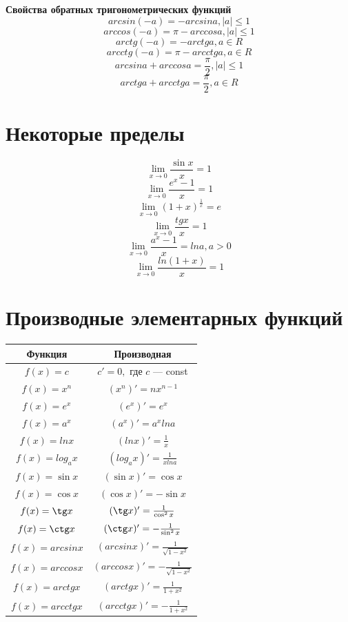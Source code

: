 \documentclass[a5paper, 8pt]{extarticle}
\begin{document}
\textbf{Свойства обратных тригонометрических функций}
$$arcsin(-a)=-arcsin a, |a|\le 1$$
$$arccos(-a)=\pi-arccos a, |a|\le 1$$
$$arctg(-a)=-arctg a, a\in R$$
$$arcctg(-a)=\pi-arcctg a, a\in R$$
$$arcsin a+ arccos a=\frac{\pi}{2}, |a|\le 1$$
$$arctg a+ arcctg a=\frac{\pi}{2}, a\in R$$

\section{Некоторые пределы}
$$\lim\limits_{x\to 0}\frac{\sin x}{x}=1$$
$$\lim\limits_{x\to 0}\frac{e^x-1}{x}=1$$
$$\lim\limits_{x\to 0}(1+x)^{\frac{1}{x}}=e$$
$$\lim\limits_{x\to 0}\frac{tg x}{x}=1$$
$$\lim\limits_{x\to 0}\frac{a^x-1}{x}=ln a, a>0$$
$$\lim\limits_{x\to 0}\frac{ln(1+x)}{x}=1$$

\section{Производные элементарных функций}

\begin{center}
{\setlength{\extrarowheight}{5pt}
\begin{tabular}{|c|c|}
\hline 
\rowcolor{Gray}
Функция & Производная \\[5pt]
\hline
$f(x)=c$ & $c'=0,$ где $c$ --- const \\[5pt]
$f(x)=x^n$ & $(x^n)'=nx^{n-1}$ \\[5pt]
$f(x)=e^x$ & $(e^x)'=e^x$ \\[5pt]
$f(x)=a^x$ & $(a^x)'=a^x lna$ \\[5pt]
$f(x)=lnx$ & $(lnx)'=\frac{1}{x}$ \\[5pt]
$f(x)=log_ax$ & $(log_ax)'=\frac{1}{xlna}$ \\[5pt]
$f(x)=\sin x$ & $(\sin x)'=\cos x$ \\[5pt]
$f(x)=\cos x$ & $(\cos x)'=-\sin x$ \\[5pt]
$f(x)=\tg x$ & $(\tg x)'=\frac{1}{\cos^2 x}$ \\[5pt]
$f(x)=\ctg x$ & $(\ctg x)'= -\frac{1}{\sin^2 x}$ \\[5pt]
$f(x)=arcsin x$ & $(arcsin x)'=\frac{1}{\sqrt{1-x^2}}$ \\[5pt]
$f(x)=arccos x$ & $(arccos x)'=-\frac{1}{\sqrt{1-x^2}}$ \\[5pt]
$f(x)=arctg x$ & $(arctg x)'=\frac{1}{1+x^2}$ \\[5pt]
$f(x)=arcctg x$ & $(arcctg x)'=-\frac{1}{1+x^2}$ \\[5pt]
\end{tabular} 
}
\end{center}
\end{document}
